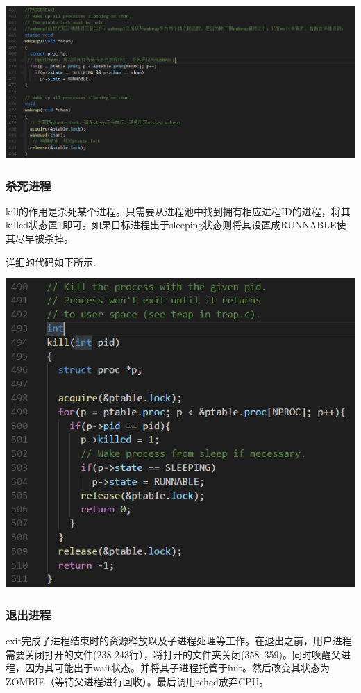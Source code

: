 \includegraphics[width=6in]{figures/process/fig13.png}

\subsubsection{杀死进程}

kill的作用是杀死某个进程。只需要从进程池中找到拥有相应进程ID的进程，将其killed状态置1即可。如果目标进程出于sleeping状态则将其设置成RUNNABLE使其尽早被杀掉。

详细的代码如下所示.

\includegraphics[width=6in]{figures/process/fig14.png}

\subsubsection{退出进程}

exit完成了进程结束时的资源释放以及子进程处理等工作。在退出之前，用户进程需要关闭打开的文件(238-243行），将打开的文件夹关闭(358~359)。同时唤醒父进程，因为其可能出于wait状态。并将其子进程托管于init。然后改变其状态为ZOMBIE（等待父进程进行回收）。最后调用sched放弃CPU。

